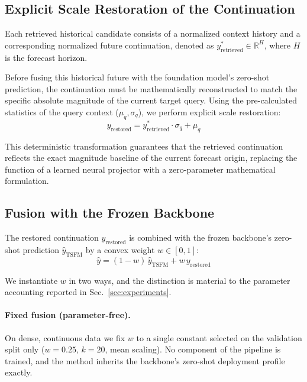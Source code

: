 \subsection{Explicit Scale Restoration of the Continuation}
Each retrieved historical candidate consists of a normalized context history and a corresponding normalized future continuation, denoted as $y^*_{\text{retrieved}} \in \mathbb{R}^H$, where $H$ is the forecast horizon.

Before fusing this historical future with the foundation model's zero-shot prediction, the continuation must be mathematically reconstructed to match the specific absolute magnitude of the current target query. Using the pre-calculated statistics of the query context ($\mu_q, \sigma_q$), we perform explicit scale restoration:
\begin{equation}
y_{\text{restored}} = y^*_{\text{retrieved}} \cdot \sigma_q + \mu_q
\end{equation}

This deterministic transformation guarantees that the retrieved continuation reflects the exact magnitude baseline of the current forecast origin, replacing the function of a learned neural projector with a zero-parameter mathematical formulation.

\subsection{Fusion with the Frozen Backbone}
\label{sec:fusion}
The restored continuation $y_{\text{restored}}$ is combined with the frozen backbone's zero-shot prediction $\hat{y}_{\text{TSFM}}$ by a convex weight $w \in [0,1]$:
\begin{equation}
\hat{y} = (1-w)\,\hat{y}_{\text{TSFM}} + w\,y_{\text{restored}}
\end{equation}

We instantiate $w$ in two ways, and the distinction is material to the parameter accounting reported in Sec.~\ref{sec:experiments}.

\paragraph{Fixed fusion (parameter-free).} On dense, continuous data we fix $w$ to a single constant selected on the validation split only ($w=0.25$, $k=20$, mean scaling). No component of the pipeline is trained, and the method inherits the backbone's zero-shot deployment profile exactly.

